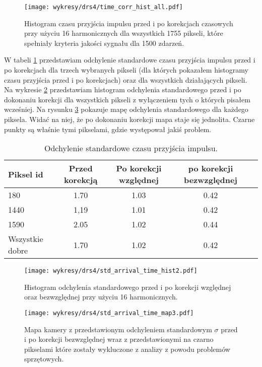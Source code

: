 \documentclass[a4paper,11pt,twoside]{article}
\begin{document}
\begin{figure}[H] 
\centering
\texttt{[image: wykresy/drs4/time\_corr\_hist\_all.pdf]}
\caption{Histogram czasu przyjścia impulsu przed i po korekcjach czasowych przy użyciu 16 harmonicznych dla wszystkich 1755 pikseli, które spełniały kryteria jakości sygnału dla 1500 zdarzeń.}
\label{fig:time_corr_hist_all}
\end{figure}
W tabeli \ref{tab:std} przedstawiam odchylenie standardowe czasu przyjścia impulsu przed i po korekcjach dla trzech wybranych pikseli (dla których pokazałem histogramy czasu przyjścia przed i po korekcjach) oraz dla wszystkich działających pikseli. Na wykresie \ref{fig:std_hist_time_corr} przedstawiam histogram odchylenia standardowego przed i po dokonaniu korekcji dla wszystkich pikseli z wyłączeniem tych o których pisałem wcześniej. Na rysunku \ref{fig:std_map_time_corr} pokazuje mapę odchylenia standardowego dla każdego piksela. Widać na niej, że po dokonaniu korekcji mapa staje się jednolita. Czarne punkty są właśnie tymi pikselami, gdzie występował jakiś problem.
\begin{table}[H]
\caption{Odchylenie standardowe czasu przyjścia impulsu.}
\begin{tabular}{|l|c|c|c|l|}
\hline
Piksel id & Przed korekcją  & Po korekcji względnej  & po korekcji bezwzględnej   \\ \hline
180  & 1.70  & 1.03  & 0.42    \\ \hline
1440 & 1,19  & 1.01  & 0.42    \\  \hline
1590 & 2.05  & 1.02  & 0.44    \\  \hline
Wszystkie dobre & 1.70  & 1.02 & 0.42   \\  \hline
\end{tabular}
\label{tab:std}
\end{table}
\begin{figure}[H] 
\centering
\texttt{[image: wykresy/drs4/std\_arrival\_time\_hist2.pdf]}
\caption{Histogram odchylenia standardowego przed i po korekcji względnej oraz bezwzględnej przy użyciu 16 harmonicznych.}
\label{fig:std_hist_time_corr}
\end{figure}

\begin{figure}[H] 
\centering
\texttt{[image: wykresy/drs4/std\_arrival\_time\_map3.pdf]}
\caption{Mapa kamery z przedstawionym odchyleniem standardowym $\sigma$ przed i po korekcji bezwzględnej wraz z przedstawionymi na czarno pikselami które zostały wykluczone z analizy z powodu problemów sprzętowych.}
\label{fig:std_map_time_corr}
\end{figure}
\end{document}
